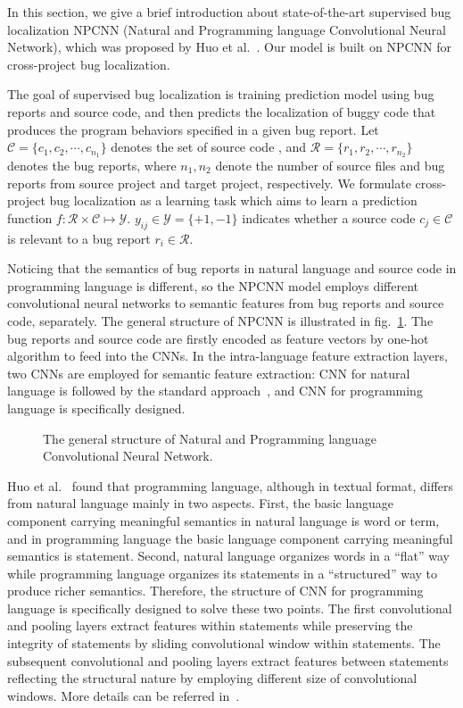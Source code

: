 In this section, we give a brief introduction about state-of-the-art supervised bug localization NPCNN (Natural and Programming language Convolutional Neural Network), which was proposed by Huo et al.~\cite{huo2016learning}. Our model is built on NPCNN for cross-project bug localization.

The goal of supervised bug localization is training prediction model using bug reports and source code,  and then predicts the localization of buggy code that produces the program behaviors specified in a given bug report. Let $\mathcal{C} =\{ c_1, c_2, \cdots, c_{n_1} \}$ denotes the set of source code , and $\mathcal{R} =\{ r_1, r_2, \cdots, r_{n_2}\} $ denotes the bug reports, where $n_1, n_2$ denote the number of source files and bug reports from source project and target project, respectively. We formulate cross-project bug localization as a learning task which aims to learn a prediction function $f: \mathcal{R} \times \mathcal{C} \mapsto \mathcal{Y}$. $y_{ij} \in \mathcal{Y} = \{+1, -1 \}$ indicates whether a source code $c_j \in \mathcal{C} $ is relevant to a bug report $r_i \in \mathcal{R}$.

Noticing that the semantics of bug reports in natural language and source code in programming language is different, so the NPCNN model employs different convolutional neural networks to semantic features from bug reports and source code, separately. The general structure of NPCNN is illustrated in fig.~\ref{fig:npcnn-structure}. The bug reports and source code are firstly encoded as feature vectors by one-hot algorithm to feed into the CNNs. In the intra-language feature extraction layers, two CNNs are employed for semantic feature extraction: CNN for natural language is followed by the standard approach~\cite{kim2014convolutional}, and CNN for programming language is specifically designed. 

\begin{figure}[hbt]
\centering
\caption{The general structure of Natural and Programming language Convolutional Neural Network.}
\label{fig:npcnn-structure}
\end{figure}

Huo et al.~\cite{huo2016learning} found that programming language, although in textual format, differs from natural language mainly in two aspects. First, the basic language component carrying meaningful semantics in natural language is word or term, and in programming language the basic language component carrying meaningful semantics is statement. Second, natural language organizes words in a ``flat'' way while programming language organizes its statements in a ``structured'' way to produce richer semantics. Therefore, the structure of CNN for programming language is specifically designed to solve these two points. The first convolutional and pooling layers extract features within statements while preserving the integrity of statements by sliding convolutional window within statements. The subsequent convolutional and pooling layers extract features between statements reflecting the structural nature by employing different size of convolutional windows. More details can be referred in~\cite{huo2016learning}.

